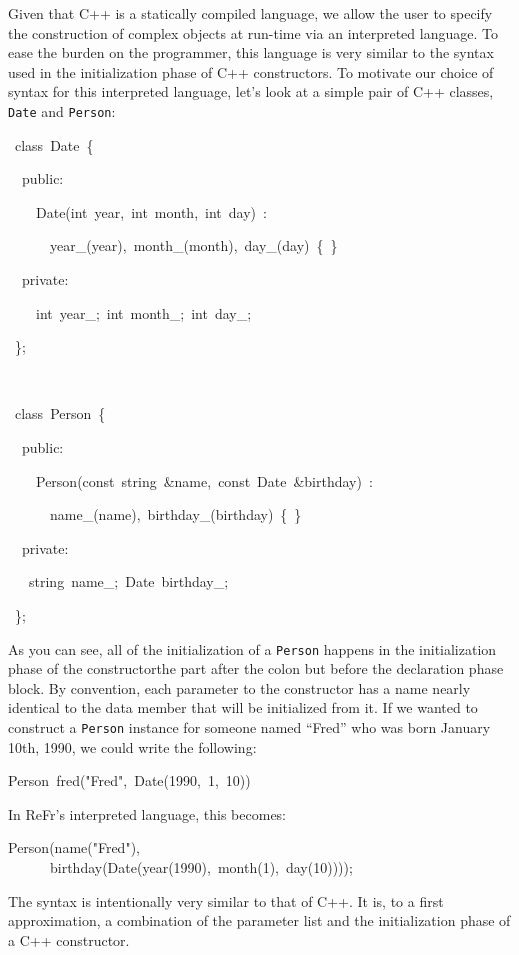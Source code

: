 \documentclass[a4paper]{article}
\let\textquotedbl="
\newenvironment{lyxcode}
{\par\begin{list}{}{
\scriptsize
\setlength{\leftmargin}{0.1in}
\setlength{\rightmargin}{\leftmargin}
\setlength{\listparindent}{0pt}%
\raggedright
\setlength{\itemsep}{0pt}
\setlength{\parsep}{0pt}
\normalfont\ttfamily}%
 \item[]}
{\end{list}}
\begin{document}
Given that C++ is a statically compiled language, we allow the user to specify
the construction of complex objects at run-time via an interpreted language. To
ease the burden on the programmer, this language is very similar to the syntax
used in the initialization phase of C++ constructors. To motivate our choice of
syntax for this interpreted language, let's look at a simple pair of C++ classes, \texttt{Date} and \texttt{Person}:
\begin{lyxcode}

~class~Date~\{

~~public:

~~~~Date(int~year,~int~month,~int~day)~:

~~~~~~year\_(year),~month\_(month),~day\_(day)~\{~\}

~~private:

~~~~int~year\_;~int~month\_;~int~day\_;

~\};

\


~class~Person~\{

~~public:

~~~~Person(const~string~\&name,~const~Date~\&birthday)~:

~~~~~~name\_(name),~birthday\_(birthday)~\{~\}

~~private:

~~~string~name\_;~Date~birthday\_;

~\};
\end{lyxcode}


As you can see, all of the initialization of a \texttt{Person} happens
in the initialization phase of the constructor\textemdash{}the part
after the colon but before the declaration phase block. By convention,
each parameter to the constructor has a name nearly identical to the
data member that will be initialized from it. If we wanted to construct
a \texttt{Person} instance for someone named \textquotedblleft{}Fred\textquotedblright{}
who was born January 10th, 1990, we could write
the following:
\begin{lyxcode}
Person~fred(\textquotedbl{}Fred\textquotedbl{},~Date(1990,~1,~10))
\end{lyxcode}
In ReFr's interpreted language, this becomes:
\begin{lyxcode}
Person(name(\textquotedbl{}Fred\textquotedbl{}),\\
~~~~~~birthday(Date(year(1990),~month(1),~day(10))));
\end{lyxcode}
The syntax is intentionally very similar to that of C++. It is,
to a first approximation, a combination of the parameter list and
the initialization phase of a C++ constructor.
\end{document}
